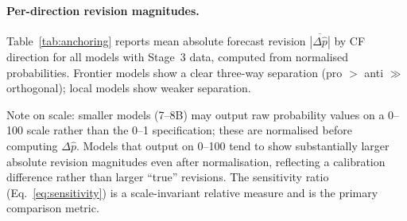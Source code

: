 \documentclass{article} %
\begin{document}
\paragraph{Per-direction revision magnitudes.}
Table~\ref{tab:anchoring} reports mean absolute forecast revision $\overline{|\Delta\hat{p}|}$
by CF direction for all models with Stage~3 data, computed from normalised probabilities.
Frontier models show a clear three-way separation (pro $>$ anti $\gg$ orthogonal);
local models show weaker separation.

Note on scale: smaller models (7--8B) may output raw probability values on a 0--100
scale rather than the 0--1 specification; these are normalised before computing
$\Delta\hat{p}$.  Models that output on 0--100 tend to show substantially larger
absolute revision magnitudes even after normalisation, reflecting a calibration
difference rather than larger ``true'' revisions.  The sensitivity ratio
(Eq.~\ref{eq:sensitivity}) is a scale-invariant relative measure and is the primary
comparison metric.
\end{document}
